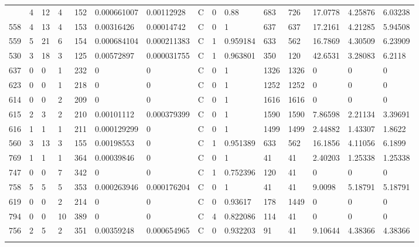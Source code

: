 \begin{latin}
\begin{longtable}{lllllllllllllll}
\begin{comment}
	557 & 4  & 12  & 4  & 152 & 0.000661007    & 0.00112928     & C & 0  & 0.88     & 683  & 726  & 17.0778 & 4.25876 & 6.03238 \\
	558 & 4  & 13  & 4  & 153 & 0.00316426     & 0.00014742     & C & 0  & 1        & 637  & 637  & 17.2161 & 4.21285 & 5.94508 \\
	559 & 5  & 21  & 6  & 154 & 0.000684104    & 0.000211383    & C & 1  & 0.959184 & 633  & 562  & 16.7869 & 4.30509 & 6.23909 \\
	530 & 3  & 18  & 3  & 125 & 0.00572897     & 0.000031755    & C & 1  & 0.963801 & 350  & 120  & 42.6531 & 3.28083 & 6.2118  \\
	637 & 0  & 0   & 1  & 232 & 0              & 0              & C & 0  & 1        & 1326 & 1326 & 0       & 0       & 0       \\
	623 & 0  & 0   & 1  & 218 & 0              & 0              & C & 0  & 1        & 1252 & 1252 & 0       & 0       & 0       \\
	614 & 0  & 0   & 2  & 209 & 0              & 0              & C & 0  & 1        & 1616 & 1616 & 0       & 0       & 0       \\
	615 & 2  & 3   & 2  & 210 & 0.00101112     & 0.000379399    & C & 0  & 1        & 1590 & 1590 & 7.86598 & 2.21134 & 3.39691 \\
	616 & 1  & 1   & 1  & 211 & 0.000129299    & 0              & C & 0  & 1        & 1499 & 1499 & 2.44882 & 1.43307 & 1.8622  \\
	560 & 3  & 13  & 3  & 155 & 0.00198553     & 0              & C & 1  & 0.951389 & 633  & 562  & 16.1856 & 4.11056 & 6.1899  \\
	769 & 1  & 1   & 1  & 364 & 0.00039846     & 0              & C & 0  & 1        & 41   & 41   & 2.40203 & 1.25338 & 1.25338 \\
	747 & 0  & 0   & 7  & 342 & 0              & 0              & C & 1  & 0.752396 & 120  & 41   & 0       & 0       & 0       \\
	758 & 5  & 5   & 5  & 353 & 0.000263946    & 0.000176204    & C & 0  & 1        & 41   & 41   & 9.0098  & 5.18791 & 5.18791 \\
	619 & 0  & 0   & 2  & 214 & 0              & 0              & C & 0  & 0.93617  & 178  & 1449 & 0       & 0       & 0       \\
	794 & 0  & 0   & 10 & 389 & 0              & 0              & C & 4  & 0.822086 & 114  & 41   & 0       & 0       & 0       \\
	756 & 2  & 5   & 2  & 351 & 0.00359248     & 0.000654965    & C & 0  & 0.932203 & 91   & 41   & 9.10644 & 4.38366 & 4.38366 \\

\end{comment}
\end{longtable}
\end{latin}
